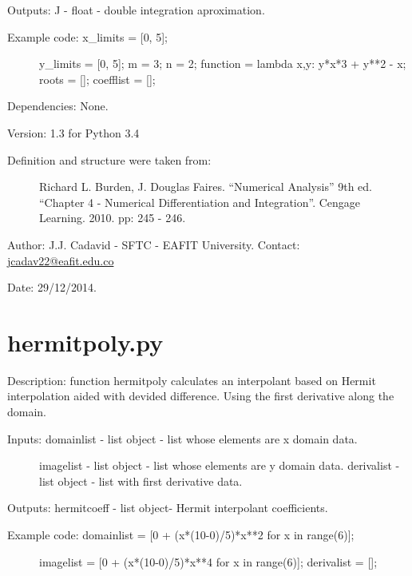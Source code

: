 \documentclass[letterpaper,10pt,oneside]{sphinxmanual}
\theoremstyle{plain}%
\theoremstyle{definition}%
\theoremstyle{remark}%
\begin{document}
Outputs: J - float - double integration aproximation.
\begin{description}
\item[{Example code: x\_limits = {[}0, 5{]};}] \leavevmode
y\_limits = {[}0, 5{]};
m = 3;
n = 2;
function = lambda x,y: y*x*3 + y**2 - x;
roots = {[}{]};
coefflist = {[}{]};

\end{description}

Dependencies: None.

Version: 1.3 for Python 3.4
\begin{description}
\item[{Definition and structure were taken from:}] \leavevmode
Richard L. Burden, J. Douglas Faires. ``Numerical Analysis'' 9th ed.
``Chapter 4 - Numerical Differentiation and Integration''. 
Cengage Learning. 2010. pp: 245 - 246.

\end{description}

Author: J.J. Cadavid - SFTC - EAFIT University.
Contact: \href{mailto:jcadav22@eafit.edu.co}{jcadav22@eafit.edu.co}

Date: 29/12/2014.


\section{hermitpoly.py}
\label{code:hermitpoly-py}\label{code:module-hermitpoly}
Description: function hermitpoly calculates an interpolant based on Hermit
interpolation aided with devided difference. Using the first derivative 
along the domain.
\begin{description}
\item[{Inputs: domainlist - list object - list whose elements are x domain data.}] \leavevmode
imagelist - list object - list whose elements are y domain data.
derivalist - list object - list with first derivative data.

\end{description}

Outputs: hermitcoeff - list object- Hermit interpolant coefficients.
\begin{description}
\item[{Example code: domainlist = {[}0 + (x*(10-0)/5)*x**2 for x in range(6){]};}] \leavevmode
imagelist = {[}0 + (x*(10-0)/5)*x**4 for x in range(6){]};
derivalist = {[}{]};

\end{description}
\end{document}
